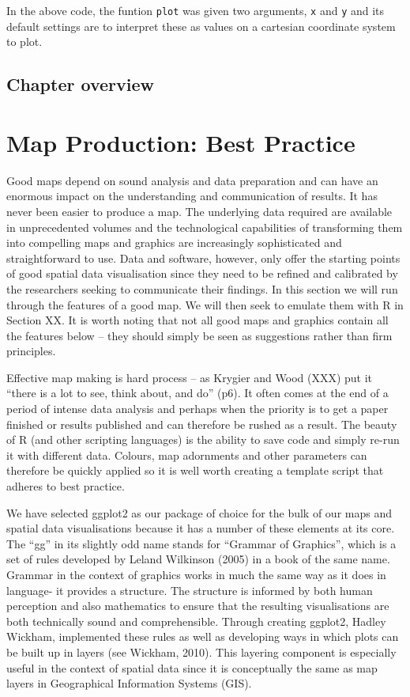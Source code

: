 \documentclass[]{article}
\begin{document}
In the above code, the funtion \texttt{plot} was given two arguments,
\texttt{x} and \texttt{y} and its default settings are to interpret
these as values on a cartesian coordinate system to plot.

\subsection{Chapter overview}

\section{Map Production: Best Practice}

Good maps depend on sound analysis and data preparation and can have an
enormous impact on the understanding and communication of results. It
has never been easier to produce a map. The underlying data required are
available in unprecedented volumes and the technological capabilities of
transforming them into compelling maps and graphics are increasingly
sophisticated and straightforward to use. Data and software, however,
only offer the starting points of good spatial data visualisation since
they need to be refined and calibrated by the researchers seeking to
communicate their findings. In this section we will run through the
features of a good map. We will then seek to emulate them with R in
Section XX. It is worth noting that not all good maps and graphics
contain all the features below -- they should simply be seen as
suggestions rather than firm principles.

Effective map making is hard process -- as Krygier and Wood (XXX) put it
``there is a lot to see, think about, and do'' (p6). It often comes at
the end of a period of intense data analysis and perhaps when the
priority is to get a paper finished or results published and can
therefore be rushed as a result. The beauty of R (and other scripting
languages) is the ability to save code and simply re-run it with
different data. Colours, map adornments and other parameters can
therefore be quickly applied so it is well worth creating a template
script that adheres to best practice.

We have selected ggplot2 as our package of choice for the bulk of our
maps and spatial data visualisations because it has a number of these
elements at its core. The ``gg'' in its slightly odd name stands for
``Grammar of Graphics'', which is a set of rules developed by Leland
Wilkinson (2005) in a book of the same name. Grammar in the context of
graphics works in much the same way as it does in language- it provides
a structure. The structure is informed by both human perception and also
mathematics to ensure that the resulting visualisations are both
technically sound and comprehensible. Through creating ggplot2, Hadley
Wickham, implemented these rules as well as developing ways in which
plots can be built up in layers (see Wickham, 2010). This layering
component is especially useful in the context of spatial data since it
is conceptually the same as map layers in Geographical Information
Systems (GIS).
\end{document}
